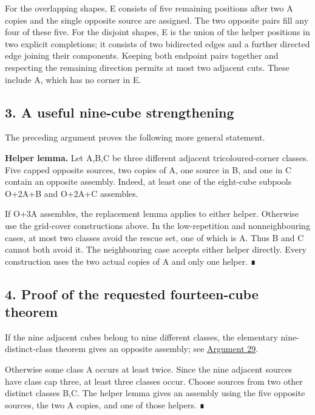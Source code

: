 \documentclass[
  10pt,
]{article}
\begin{document}
For the overlapping shapes, E consists of five remaining positions after
two A copies and the single opposite source are assigned. The two
opposite pairs fill any four of these five. For the disjoint shapes, E
is the union of the helper positions in two explicit completions; it
consists of two bidirected edges and a further directed edge joining
their components. Keeping both endpoint pairs together and respecting
the remaining direction permits at most two adjacent cuts. These include
A, which has no corner in E.

\hypertarget{a-useful-nine-cube-strengthening}{%
\subsection*{3. A useful nine-cube
strengthening}\label{a-useful-nine-cube-strengthening}}

The preceding argument proves the following more general statement.

\textbf{Helper lemma.} Let A,B,C be three different adjacent
tricoloured-corner classes. Five capped opposite sources, two copies of
A, one source in B, and one in C contain an opposite assembly. Indeed,
at least one of the eight-cube subpools O+2A+B and O+2A+C assembles.

If O+3A assembles, the replacement lemma applies to either helper.
Otherwise use the grid-cover constructions above. In the low-repetition
and nonneighbouring cases, at most two classes avoid the rescue set, one
of which is A. Thus B and C cannot both avoid it. The neighbouring case
accepts either helper directly. Every construction uses the two actual
copies of A and only one helper. ∎

\hypertarget{proof-of-the-requested-fourteen-cube-theorem}{%
\subsection*{4. Proof of the requested fourteen-cube
theorem}\label{proof-of-the-requested-fourteen-cube-theorem}}

If the nine adjacent cubes belong to nine different classes, the
elementary nine-distinct-class theorem gives an opposite assembly; see
\protect\hyperlink{arg-29}{Argument 29}.

Otherwise some class A occurs at least twice. Since the nine adjacent
sources have class cap three, at least three classes occur. Choose
sources from two other distinct classes B,C. The helper lemma gives an
assembly using the five opposite sources, the two A copies, and one of
those helpers. ∎
\end{document}
